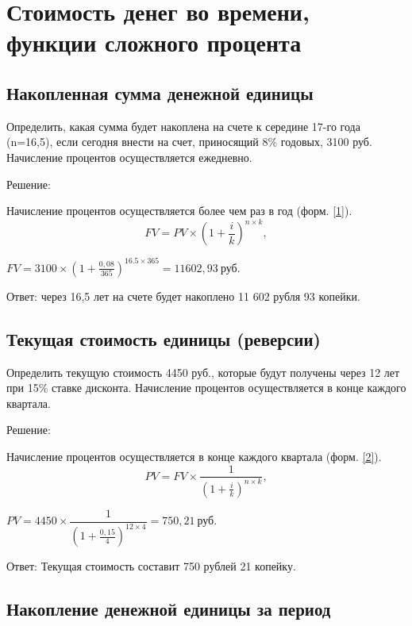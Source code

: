\section{Стоимость денег во времени, функции сложного процента}
\subsection{Накопленная сумма денежной единицы}

Определить, какая сумма будет накоплена на счете к середине 17-го года (n=16,5), если сегодня внести на счет, приносящий 8\% годовых, 3100 руб. Начисление процентов осуществляется ежедневно.

Решение:

Начисление процентов осуществляется более чем раз в год (форм. \ref{1}).
\begin{equation}\label{1}
FV = PV \times(1+\frac{i}{k})^{n \times k},
\end{equation}

$ FV = 3100 \times (1+\frac{0,08}{365})^{16.5 \times 365} =11602,93\  \text{руб.} $

Ответ: через 16,5 лет на счете будет накоплено 11 602 рубля 93 копейки.

\subsection{Текущая стоимость единицы (реверсии)}

Определить текущую стоимость 4450 руб., которые будут получены через 12 лет при 15\% ставке дисконта. Начисление процентов осуществляется в конце каждого квартала.

Решение:

Начисление процентов осуществляется в конце каждого квартала (форм. \ref{2}).
\begin{equation}\label{2}
PV = FV \times \dfrac{1}{(1+\frac{i}{k})^{n \times k}},
\end{equation}

$ PV = 4450 \times \dfrac{1}{(1+\frac{0,15}{4})^{12 \times 4}} = 750,21\  \text{руб.}   $
	
Ответ: Текущая стоимость составит 750 рублей 21 копейку.

\subsection{Накопление денежной единицы за период}






